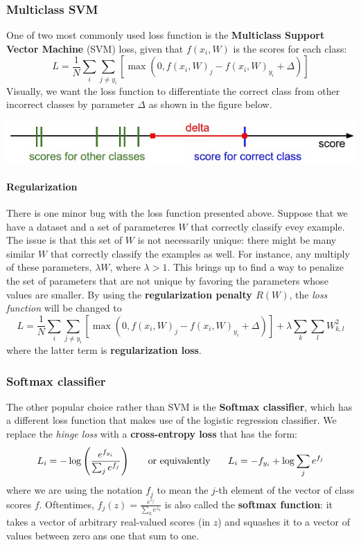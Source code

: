 \documentclass{article}
\begin{document}
\subsubsection{Multiclass SVM}
One of two most commonly used loss function is the \textbf{Multiclass Support Vector Machine} (SVM) loss, given that $f(x_i, W)$ is the scores for each class:
\begin{equation*}
	L = \frac{1}{N}\sum_{i}\sum_{j \ne y_i}\left[\max(0,f(x_i,W)_j - f(x_i,W)_{y_i} + \Delta)\right]
\end{equation*}
Visually, we want the loss function to differentiate the correct class from other incorrect classes by parameter $\Delta$ as shown in the figure below. \\
\begin{center}
\includegraphics[scale=0.4]{images/margin.jpg}
\end{center}

\paragraph{Regularization} There is one minor bug with the loss function presented above. Suppose that we have a dataset and a set of parameteres $W$ that correctly classify evey example. The issue is that this set of $W$ is not necessarily unique: there might be many similar $W$ that correctly classify the examples as well. For instance, any multiply of these parameters, $\lambda W$, where $\lambda > 1$. This brings up to find a way to penalize the set of parameters that are not unique by favoring the parameters whose values are smaller. By using the \textbf{regularization penalty $R(W)$}, the \textit{loss function} will be changed to
\begin{equation*}
	L = \frac{1}{N}\sum_{i}\sum_{j \ne y_i}\left[\max(0,f(x_i,W)_j - f(x_i,W)_{y_i} + \Delta)\right] + \lambda \sum_k \sum_l W^2_{k,l}
\end{equation*}
where the latter term is \textbf{regularization loss}.

\subsubsection{Softmax classifier}
The other popular choice rather than SVM is the \textbf{Softmax classifier}, which has a different loss function that makes use of the logistic regression classifier. We replace the \textit{hinge loss} with a \textbf{cross-entropy loss} that has the form:
\begin{equation*}
	L_i = -\log\left(\frac{e^{f_{y_i}}}{\sum_j e^{f_j}}\right) \text{ \indent or equivalently \indent} L_i = -f_{y_i} + \log \sum_j e^{f_j}
\end{equation*}
where we are using the notation $f_j$ to mean the $j$-th element of the vector of class scores $f$. Oftentimes, $f_j(z) = \frac{e^{z_j}}{\sum_k e^{z_k}}$ is also called the \textbf{softmax function}: it takes a vector of arbitrary real-valued scores (in $z$) and squashes it to a vector of values between zero ans one that sum to one.
\end{document}
